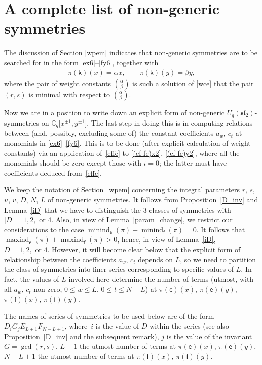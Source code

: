 \documentclass[pdftex]{sigma}
\numberwithin{equation}{section}
\begin{document}
\section{A complete list of non-generic symmetries}\label{clngs}

The discussion of Section \ref{wpem} indicates that non-generic symmetries are to be searched for in the form \eqref{ex6}--\eqref{fy6}, together with
\begin{gather*}\pi(\mathsf{k})(x)=\alpha x,\qquad\pi(\mathsf{k})(y)=\beta y,\end{gather*}
where the pair of weight constants $\binom{\alpha}{\beta}$ is such a solution of \eqref{wce} that the pair $(r,s)$ is minimal with respect to $\binom{\alpha}{\beta}$.

Now we are in a position to write down an explicit form of non-generic $U_q(\mathfrak{sl}_2)$-symmetries on $\mathbb{C}_q\big[x^{\pm 1},y^{\pm 1}\big]$. The last step in doing this is in computing relations between (and, possibly, excluding some of) the constant coefficients $a_w$, $c_t$ at monomials in \eqref{ex6}--\eqref{fy6}. This is to be done (after explicit calculation of weight constants) via an application of~\eqref{effe} to \eqref{(ef-fe)x2}, \eqref{(ef-fe)y2}, where all the monomials should be zero except those with $i=0$; the latter must have coefficients deduced from~\eqref{effe}.

We keep the notation of Section~\ref{wpem} concerning the integral parameters $r$, $s$, $u$, $v$, $D$, $N$, $L$ of non-generic symmetries. It follows from Proposition~\ref{D_inv} and Lemma~\ref{iD} that we have to distinguish the 3 classes of symmetries with $|D|=1,2,\text{\ or\ }4$. Also, in view of Lemma~\ref{param_change}, we restrict our considerations to the case $\operatorname{minind}_\mathsf{e}(\pi)+\operatorname{minind}_\mathsf{f}(\pi)=0$. It follows that $\operatorname{maxind}_\mathsf{e}(\pi)+ \operatorname{maxind}_\mathsf{f}(\pi)>0$, hence, in view of Lemma~\ref{iD}, $D=1,2,\text{\ or\ }4$. However, it will become clear below that the explicit form of relationship between the coefficients $a_w$, $c_t$ depends on $L$, so we need to partition the class of symmetries into finer series corresponding to specific values of $L$. In fact, the values of $L$ involved here determine the number of terms (utmost, with all $a_w$, $c_t$ non-zero, $0\le w\le L$, $0\le t\le N-L$) at $\pi(\mathsf{e})(x)$, $\pi(\mathsf{e})(y)$, $\pi(\mathsf{f})(x)$, $\pi(\mathsf{f})(y)$.

The names of series of symmetries to be used below are of the form $D_iG_jE_{L+1}F_{N-L+1}$, where~$i$ is the value of $D$ within the series (see also Proposition~\ref{D_inv} and the subsequent remark), $j$ is the value of the invariant $G=\operatorname{gcd}(r,s)$, $L+1$ the utmost number of terms at $\pi(\mathsf{e})(x)$, $\pi(\mathsf{e})(y)$, $N-L+1$ the utmost number of terms at $\pi(\mathsf{f})(x)$, $\pi(\mathsf{f})(y)$.
\end{document}
